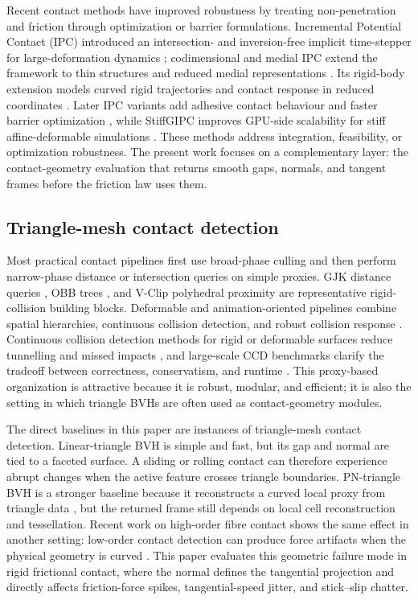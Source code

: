 \documentclass[preprint,12pt]{elsarticle}
\begin{document}
Recent contact methods have improved robustness by treating non-penetration and friction through optimization or barrier formulations. Incremental Potential Contact (IPC) introduced an intersection- and inversion-free implicit time-stepper for large-deformation dynamics \cite{li2020ipc}; codimensional and medial IPC extend the framework to thin structures and reduced medial representations \cite{li2021codimipc,lan2021medialipc}. Its rigid-body extension models curved rigid trajectories and contact response in reduced coordinates \cite{ferguson2021rigidipc}. Later IPC variants add adhesive contact behaviour and faster barrier optimization \cite{fang2024aipc,huang2024gipc}, while StiffGIPC improves GPU-side scalability for stiff affine-deformable simulations \cite{stiffgipc2025}. These methods address integration, feasibility, or optimization robustness. The present work focuses on a complementary layer: the contact-geometry evaluation that returns smooth gaps, normals, and tangent frames before the friction law uses them.

\subsection{Triangle-mesh contact detection}

Most practical contact pipelines first use broad-phase culling and then perform narrow-phase distance or intersection queries on simple proxies. GJK distance queries \cite{gilbert1988}, OBB trees \cite{gottschalk1996}, and V-Clip polyhedral proximity \cite{mirtich1998} are representative rigid-collision building blocks. Deformable and animation-oriented pipelines combine spatial hierarchies, continuous collision detection, and robust collision response \cite{teschner2005,bridson2002,harmon2008}. Continuous collision detection methods for rigid or deformable surfaces reduce tunnelling and missed impacts \cite{redon2002,brochu2012,pabst2010}, and large-scale CCD benchmarks clarify the tradeoff between correctness, conservatism, and runtime \cite{wang2021ccd}. This proxy-based organization is attractive because it is robust, modular, and efficient; it is also the setting in which triangle BVHs are often used as contact-geometry modules.

The direct baselines in this paper are instances of triangle-mesh contact detection. Linear-triangle BVH is simple and fast, but its gap and normal are tied to a faceted surface. A sliding or rolling contact can therefore experience abrupt changes when the active feature crosses triangle boundaries. PN-triangle BVH is a stronger baseline because it reconstructs a curved local proxy from triangle data \cite{vlachos2001pn}, but the returned frame still depends on local cell reconstruction and tessellation. Recent work on high-order fibre contact shows the same effect in another setting: low-order contact detection can produce force artifacts when the physical geometry is curved \cite{crespel2024fibres}. This paper evaluates this geometric failure mode in rigid frictional contact, where the normal defines the tangential projection and directly affects friction-force spikes, tangential-speed jitter, and stick--slip chatter.
\end{document}
